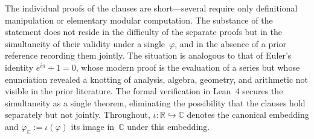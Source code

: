 \documentclass[11pt]{amsart}
\theoremstyle{definition}
\newcommand{\golden}{\varphi}
\begin{document}
The individual proofs of the clauses are short---several require only
definitional manipulation or elementary modular computation.  The
substance of the statement does not reside in the difficulty of the
separate proofs but in the simultaneity of their validity under a
single~$\golden$, and in the absence of a prior reference recording
them jointly.  The situation is analogous to that of Euler's identity
$e^{i\pi}+1=0$, whose modern proof is the evaluation of a series but
whose enunciation revealed a knotting of analysis, algebra, geometry,
and arithmetic not visible in the prior literature.  The formal
verification in Lean~4 secures the simultaneity as a single theorem,
eliminating the possibility that the clauses hold separately but not
jointly.  Throughout, $\iota:\mathbb{R}\hookrightarrow\mathbb{C}$
denotes the canonical embedding and $\golden_\mathbb{C}:=\iota(\golden)$
its image in~$\mathbb{C}$ under this embedding.
\end{document}
